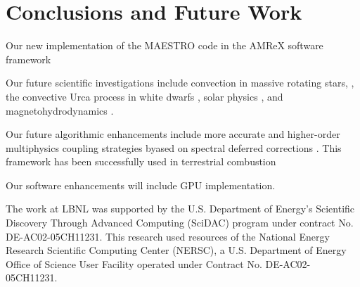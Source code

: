 \section{Conclusions and Future Work}\label{sec:conclusions}
Our new implementation of the MAESTRO code in the AMReX software framework 

Our future scientific investigations include convection in massive rotating stars, \citep{heger2000presupernova}, the convective Urca process in white dwarfs \citep{willcox2016type}, solar physics \citep{wood2018self}, and magnetohydrodynamics \citep{wood2015three,wood2011sun}.

Our future algorithmic enhancements include more accurate and higher-order multiphysics coupling strategies byased on spectral deferred corrections \cite{dutt2000spectral,bourlioux2003high}.
This framework has been successfully used in terrestrial combustion \cite{pazner2016high,nonaka2018conservative}

Our software enhancements will include GPU implementation.

\acknowledgements

The work at LBNL was supported by the U.S. Department of Energy's Scientific Discovery Through Advanced Computing (SciDAC) program under contract No. DE-AC02-05CH11231.
This research used resources of the National Energy Research Scientific Computing Center (NERSC), a U.S. Department of Energy Office of Science User Facility operated under Contract No. DE-AC02-05CH11231.
